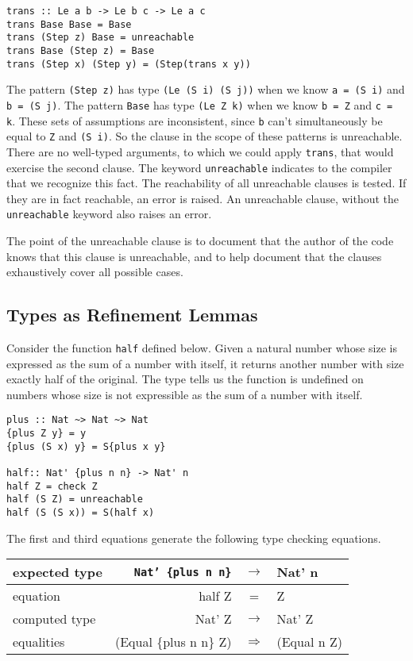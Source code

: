 \documentclass[11pt,twoside]{article}
\newcommand{\plus}[2]{\{plus {#1} {#2}\}}
\begin{document}
\begin{verbatim}
trans :: Le a b -> Le b c -> Le a c
trans Base Base = Base
trans (Step z) Base = unreachable
trans Base (Step z) = Base
trans (Step x) (Step y) = (Step(trans x y))  
\end{verbatim}
The pattern \verb+(Step z)+ has type \verb+(Le (S i) (S j))+
when we know \verb+a = (S i)+ and \verb+b = (S j)+. 
The pattern \verb+Base+ has type \verb+(Le Z k)+ when we
know \verb+b = Z+ and \verb+c = k+. These sets of assumptions
are inconsistent, since \verb+b+ can't simultaneously
be equal to \verb+Z+ and \verb+(S i)+. So the clause in the
scope of these patterns is unreachable. There are no well-typed
arguments, to which we could apply {\tt trans}, that would
exercise the second clause. The keyword {\tt unreachable}
indicates to the compiler that we recognize this fact. 
The reachability of all unreachable clauses is tested.
If they are in fact reachable, an error is raised. An
unreachable clause, without the {\tt unreachable} keyword
also raises an error.

The point of the unreachable clause is to document that the
author of the code knows that this clause is unreachable, and to
help document that the clauses exhaustively cover all
possible cases.


\subsection{Types as Refinement Lemmas} \label{refine}

Consider the function {\tt half} defined below. Given a natural
number whose size is expressed as the sum of a number with itself,
it returns another number with size exactly half of the original. The
type tells us the function is undefined on numbers whose
size is not expressible as the sum of a number with itself.

\begin{verbatim}
plus :: Nat ~> Nat ~> Nat
{plus Z y} = y
{plus (S x) y} = S{plus x y}

half:: Nat' {plus n n} -> Nat' n
half Z = check Z
half (S Z) = unreachable
half (S (S x)) = S(half x)
\end{verbatim}

\noindent
The first and third equations generate the following type checking equations.

\vspace*{.1in}
\begin{tabular}{|l|rcl|} \hline
{\small expected type} & {\small{\tt Nat' \plus{n}{n}}} & $\rightarrow$ & {\small Nat' n} \\ \hline
{\small equation} & {\small half Z} & =             & {\small Z} \\ \hline
{\small computed type} & {\small Nat' Z} & $\rightarrow$ & {\small Nat' Z} \\ \hline
{\small equalities}    & {\small (Equal \plus{n}{n} Z)} & $\Rightarrow$ & {\small (Equal n Z)} \\ \hline 
\end{tabular}
\vspace*{.1in}
\end{document}
